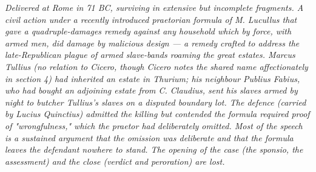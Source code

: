 
\textit{Delivered at Rome in 71 BC, surviving in extensive but incomplete
fragments. A civil action under a recently introduced praetorian formula
of M. Lucullus that gave a quadruple-damages remedy against any household
which by force, with armed men, did damage by malicious design --- a remedy
crafted to address the late-Republican plague of armed slave-bands roaming
the great estates. Marcus Tullius (no relation to Cicero, though Cicero
notes the shared name affectionately in section 4) had inherited an estate
in Thurium; his neighbour Publius Fabius, who had bought an adjoining
estate from C. Claudius, sent his slaves armed by night to butcher
Tullius's slaves on a disputed boundary lot. The defence (carried by
Lucius Quinctius) admitted the killing but contended the formula required
proof of "wrongfulness," which the praetor had deliberately omitted. Most
of the speech is a sustained argument that the omission was deliberate
and that the formula leaves the defendant nowhere to stand. The opening
of the case (the sponsio, the assessment) and the close (verdict and
peroration) are lost.}
